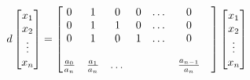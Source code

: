 \[
  d
  \begin{bmatrix}
    x_1 \\ x_2 \\ \vdots \\ x_n
  \end{bmatrix}
  =
  \begin{bmatrix}
    0 & 1 & 0 & 0 & \dots & 0\\
    0 & 1 & 1 & 0 & \dots & 0\\
    0 & 1 & 0 & 1 & \dots & 0\\
    \\
    a_0 \over a_n & a_1 \over a_n & \dots & & & a_{n-1} \over a_n & 
  \end{bmatrix}
  \begin{bmatrix}
    x_1 \\ x_2 \\ \vdots \\ x_n
  \end{bmatrix}
\]